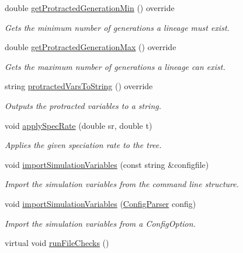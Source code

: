 \begin{DoxyCompactItemize}
double \hyperlink{class_protracted_tree_a331561815abc7d595e88d98e9268e7a1}{get\+Protracted\+Generation\+Min} () override
\begin{DoxyCompactList}\small\item\em Gets the minimum number of generations a lineage must exist. \end{DoxyCompactList}\item 
double \hyperlink{class_protracted_tree_a2093dd13cdbfc66e6c1de1406023bad6}{get\+Protracted\+Generation\+Max} () override
\begin{DoxyCompactList}\small\item\em Gets the maximum number of generations a lineage can exist. \end{DoxyCompactList}\item 
string \hyperlink{class_protracted_tree_a505a464578e6a7028e66f26b3e6b4a92}{protracted\+Vars\+To\+String} () override
\begin{DoxyCompactList}\small\item\em Outputs the protracted variables to a string. \end{DoxyCompactList}\item 
void \hyperlink{class_protracted_tree_a56a3631e65bb91d04ba4626c4c1ea79a}{apply\+Spec\+Rate} (double sr, double t)
\begin{DoxyCompactList}\small\item\em Applies the given speciation rate to the tree. \end{DoxyCompactList}\item 
void \hyperlink{class_tree_a455d87022772b309a5974ea5f0295139}{import\+Simulation\+Variables} (const string \&configfile)
\begin{DoxyCompactList}\small\item\em Import the simulation variables from the command line structure. \end{DoxyCompactList}\item 
void \hyperlink{class_tree_a43c8d5001964ac7dac4d55059ebc9b38}{import\+Simulation\+Variables} (\hyperlink{class_config_parser}{Config\+Parser} config)
\begin{DoxyCompactList}\small\item\em Import the simulation variables from a Config\+Option. \end{DoxyCompactList}\item 
virtual void \hyperlink{class_tree_a0aefbe2466aefd46dec8c4aea4c85c5e}{run\+File\+Checks} ()\hypertarget{class_tree_a0aefbe2466aefd46dec8c4aea4c85c5e}{}\label{class_tree_a0aefbe2466aefd46dec8c4aea4c85c5e}


\end{DoxyCompactItemize}
